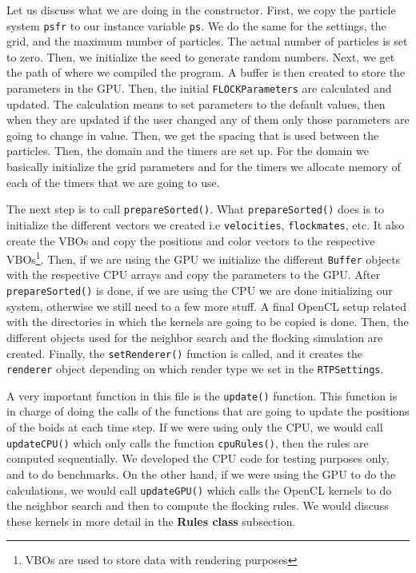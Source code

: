Let us discuss what we are doing in the constructor. First, we copy the particle system \texttt{psfr} to our instance variable \texttt{ps}. We do the same for the settings, the grid, and the maximum number of particles. The actual number of particles is set to zero. Then, we initialize the seed to generate random numbers. Next, we get the path of where we compiled the program. A buffer is then created to store the parameters in the GPU. Then, the initial \texttt{FLOCKParameters} are calculated and updated. The calculation means to set parameters to the default values, then when they are updated if the user changed any of them only those parameters are going to change in value. Then, we get the spacing that is used between the particles. Then, the domain and the timers are set up. For the domain we basically initialize the grid parameters and for the timers we allocate memory of each of the timers that we are going to use.

The next step is to call \texttt{prepareSorted()}. What \texttt{prepareSorted()} does is to initialize the different vectors we created i.e \texttt{velocities}, \texttt{flockmates}, etc. It also create the VBOs and copy the positions and color vectors to the respective VBOs\footnote{VBOs are used to store data with rendering purposes}. Then, if we are using the GPU we initialize the different \texttt{Buffer} objects with the respective CPU arrays and copy the parameters to the GPU. After \texttt{prepareSorted()} is done, if we are using the CPU we are done initializing our system, otherwise we still need to a few more stuff. A final OpenCL setup related with the directories in which the kernels are going to be copied is done. Then, the different objects used for the neighbor search and the flocking simulation are created. Finally, the \texttt{setRenderer()} function is called, and it creates the \texttt{renderer} object depending on which render type we set in the \texttt{RTPSettings}.

A very important function in this file is the \texttt{update()} function. This function is in charge of doing the calls of the functions that are going to update the positions of the boids at each time step. If we were using only the CPU, we would call \texttt{updateCPU()} which only calls the function \texttt{cpuRules()}, then the rules are computed sequentially. We developed the CPU code for testing purposes only, and to do benchmarks. On the other hand, if we were using the GPU to do the calculations, we would call \texttt{updateGPU()} which calls the OpenCL kernels to do the neighbor search and then to compute the flocking rules. We would discuss these kernels in more detail in the \textbf{Rules class} subsection.

